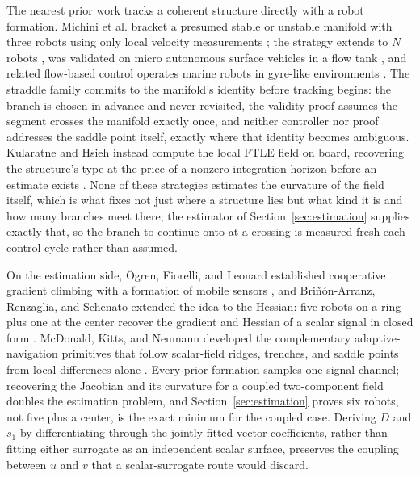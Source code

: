 \documentclass[lettersize,journal]{IEEEtran}
\begin{document}
The nearest prior work tracks a coherent structure directly with a
robot formation. Michini et al. bracket a presumed stable or unstable
manifold with three robots using only local velocity measurements
\cite{9}; the strategy extends to $N$ robots \cite{10}, was validated
on micro autonomous surface vehicles in a flow tank \cite{11}, and
related flow-based control operates marine robots in gyre-like
environments \cite{12}. The straddle family commits to the manifold's
identity before tracking begins: the branch is chosen in advance and
never revisited, the validity proof assumes the segment crosses the
manifold exactly once, and neither controller nor proof addresses the
saddle point itself, exactly where that identity becomes ambiguous.
Kularatne and Hsieh instead compute the local FTLE field on board,
recovering the structure's type at the price of a nonzero integration
horizon before an estimate exists \cite{13}. None of these strategies
estimates the curvature of the field itself, which is what fixes not
just where a structure lies but what kind it is and how many branches
meet there; the estimator of Section~\ref{sec:estimation} supplies
exactly that, so the branch to continue onto at a crossing is measured
fresh each control cycle rather than assumed.

On the estimation side, \"{O}gren, Fiorelli, and Leonard established
cooperative gradient climbing with a formation of mobile sensors
\cite{26}, and Bri\~{n}\'{o}n-Arranz, Renzaglia, and Schenato extended
the idea to the Hessian: five robots on a ring plus one at the center
recover the gradient and Hessian of a scalar signal in closed form
\cite{15}. McDonald, Kitts, and Neumann developed the complementary
adaptive-navigation primitives that follow scalar-field ridges,
trenches, and saddle points from local differences alone
\cite{27,28,29}. Every prior formation samples one signal channel;
recovering the Jacobian and its curvature for a coupled two-component
field doubles the estimation problem, and Section~\ref{sec:estimation}
proves six robots, not five plus a center, is the exact minimum for the
coupled case. Deriving $D$ and $s_1$ by differentiating through the
jointly fitted vector coefficients, rather than fitting either
surrogate as an independent scalar surface, preserves the coupling
between $u$ and $v$ that a scalar-surrogate route would discard.
\end{document}
